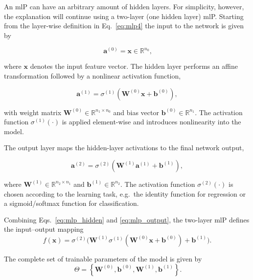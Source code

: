An \gls{ml}P can have an arbitrary amount of hidden layers. For simplicity, however, the explanation will continue using a two-layer (one hidden layer) \gls{ml}P\@.
Starting from the layer-wise definition in Eq.~\eqref{eq:mlp4} the input to the network is given by

\begin{equation}~\label{eq:mlp5}
\mathbf{a}^{(0)} = \mathbf{x} \in \mathbb{R}^{n_0},
\end{equation}

where $\mathbf{x}$ denotes the input feature vector.
The hidden layer performs an affine transformation followed by a nonlinear activation function,

\begin{equation}
\label{eq:mlp_hidden}
\mathbf{a}^{(1)} =
\sigma^{(1)}\!\left(
\mathbf{W}^{(0)} \mathbf{x} + \mathbf{b}^{(0)}
\right),
\end{equation}

with weight matrix $\mathbf{W}^{(0)} \in \mathbb{R}^{n_1 \times n_0}$ and bias vector $\mathbf{b}^{(0)} \in \mathbb{R}^{n_1}$. The activation function $\sigma^{(1)}(\cdot)$ is applied element-wise and introduces nonlinearity into the model.

The output layer maps the hidden-layer activations to the final network output,

\begin{equation}
\label{eq:mlp_output}
\mathbf{a}^{(2)} =
\sigma^{(2)}\!\left(
\mathbf{W}^{(1)} \mathbf{a}^{(1)} + \mathbf{b}^{(1)}
\right),
\end{equation}

where $\mathbf{W}^{(1)} \in \mathbb{R}^{n_2 \times n_1}$ and $\mathbf{b}^{(1)} \in \mathbb{R}^{n_2}$. The activation function $\sigma^{(2)}(\cdot)$ is chosen according to the learning task, e.g.\ the identity function for regression or a sigmoid/softmax function for classification.

Combining Eqs.~\eqref{eq:mlp_hidden} and \eqref{eq:mlp_output}, the two-layer \gls{ml}P defines the input–output mapping
\begin{equation}
\label{eq:mlp_2layer_full}
f(\mathbf{x}) =
\sigma^{(2)}\!\Big(
\mathbf{W}^{(1)}
\sigma^{(1)}\!\left(
\mathbf{W}^{(0)} \mathbf{x} + \mathbf{b}^{(0)}
\right)
+ \mathbf{b}^{(1)}
\Big).
\end{equation}

The complete set of trainable parameters of the model is given by
\begin{equation}~\label{eq:mlp_total}
\Theta =
\left\{
\mathbf{W}^{(0)}, \mathbf{b}^{(0)},
\mathbf{W}^{(1)}, \mathbf{b}^{(1)}
\right\}.
\end{equation}

